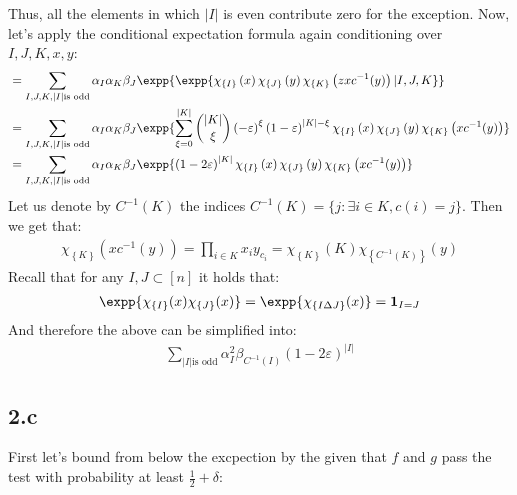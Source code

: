 \documentclass{article}
\newcommand{\Chi}[1]{\chi_{ \left\{ #1  \right\} } }
\begin{document}
Thus, all the elements in which $|I|$ is even contribute zero for the exception. Now, let's apply the conditional expectation formula again conditioning over $I,J,K, x,y$:   
\begin{equation*}
  \begin{split}
    &  = \sum_{I,J,K, |I| \text{is odd} }\alpha_{I}\alpha_{K}\beta_{J} \expp{\expp{ \Chi{I}\left(  x \right)\Chi{J}\left( y \right) \Chi{K}\left( zx c^{-1}(y) \right) | I,J,K }} \\  
    &  = \sum_{I,J,K, |I| \text{is odd} }\alpha_{I}\alpha_{K}\beta_{J} \expp{ \sum_{ \xi = 0}^{|K|}{ { |K| \choose \xi } \left( -\varepsilon \right)^{\xi} \left( 1 - \varepsilon \right)^{|K|- \xi} \Chi{I}\left(  x \right)\Chi{J}\left( y \right) \Chi{K}\left( x c^{-1}(y) \right) }} \\  
    &  = \sum_{I,J,K, |I| \text{is odd} }\alpha_{I}\alpha_{K}\beta_{J} \expp{ \left( 1 -2 \varepsilon \right)^{|K|} \Chi{I}\left(  x \right)\Chi{J}\left( y \right) \Chi{K}\left( x c^{-1}(y) \right) }   
  \end{split}
\end{equation*}
Let us denote by $C^{-1}(K)$ the indices $C^{-1}(K) = \{ j : \exists i \in K, c(i) = j \}$. Then we get that:  
\begin{equation*}
  \begin{split}
    \Chi{K}\left( x c^{-1}(y) \right) = \prod_{i \in K}{x_{i}y_{c_{i}}} =  \Chi{K}\left( K \right) \Chi{C^{-1}(K)}\left( y  \right)
  \end{split}
\end{equation*} Recall that for any $I,J \subset [n]$ it holds that: 
\begin{equation*}
  \begin{split}
    \expp{ \Chi{I}(x)\Chi{J}(x) } = \expp{ \Chi{I \Delta J}(x) } = \mathbf{1}_{ I = J }
  \end{split}
\end{equation*}
And therefore the above can be simplified into: 
\begin{equation*}
  \begin{split}
    \sum_{|I| \text{is odd} }{\alpha_{I}^{2}\beta_{C^{-1}(I)}  \left( 1 -2 \varepsilon \right)^{|I|}}   
  \end{split}
\end{equation*}

\subsection{2.c} 
First let's bound from below the excpection by the given that $f$ and $g$ pass the test with probability at least $\frac{1}{2} + \delta$:
\end{document}
